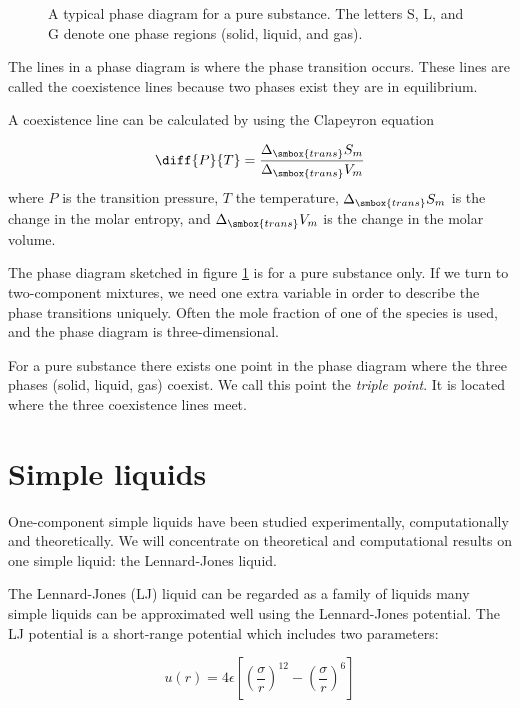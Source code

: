 \begin{figure}
  \begin{center}
    
  \end{center}
  \caption[Phase diagram of a pure substance]{A typical phase diagram
  for a pure substance. The letters S, L, and G denote one phase
  regions (solid, liquid, and gas).\label{fig:PhaseDiagram}} 
\end{figure}

The lines in a phase diagram is where the phase transition
occurs. These lines are called the coexistence lines because two phases
exist \ie they are in equilibrium. 

A coexistence line can be calculated by using the Clapeyron equation \ie 

\begin{equation}
  \diff{P}{T} =
  \frac{\Delta_{\smbox{trans}}S_m}{\Delta_{\smbox{trans}}V_m}
\end{equation}
where $P$ is the transition pressure, $T$ the temperature,
$\Delta_{\smbox{trans}}S_m$ is the change in the molar entropy, and
$\Delta_{\smbox{trans}}V_m$ is the change in the molar volume. 

The phase diagram sketched in figure \ref{fig:PhaseDiagram} is for a
pure substance only. If we turn to two-component mixtures, we need one
extra variable in order to describe the phase transitions
uniquely. Often the mole fraction of one of the species is used, and
the phase diagram is three-dimensional. 

For a pure substance there exists one point in the phase diagram where
the three phases (solid, liquid, gas) coexist. We call this point
the \textit{triple point}. It is located where the three coexistence
lines meet. 


\section{Simple liquids}
\label{sect:SimpleLiq}
One-component simple liquids have been studied experimentally,
computationally and theoretically. We will concentrate on theoretical
and computational results on one simple liquid: the Lennard-Jones liquid.

The Lennard-Jones (LJ) liquid can be regarded as a family of liquids \ie
many simple liquids can be approximated well using the Lennard-Jones
potential. The LJ potential is a short-range potential which includes
two parameters:

\begin{equation}
  u(r) = 4\epsilon \left[\left(\frac{\sigma}{r}\right)^{12} -
    \left(\frac{\sigma}{r}\right)^6 \right]
\end{equation}

